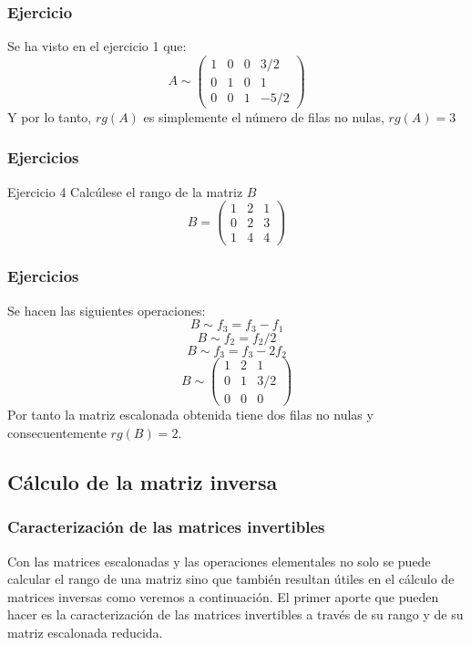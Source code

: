 \documentclass[12pt]{article}
\begin{document}
       \begin{frame}
  \frametitle{Ejercicio}
Se ha visto en el ejercicio 1 que:
  \[A\sim \left(\begin{array}{cccc}1 & 0 & 0 & 3/2 \\0 & 1 & 0 & 1 \\0 & 0 & 1 & -5/2\end{array}\right)\]
  Y por lo tanto, $rg(A)$ es simplemente el n\'umero de filas no nulas, $rg(A)=3$
  \end{frame} 
  
     \begin{frame}
  \frametitle{Ejercicios}
   \begin{block}{Ejercicio 4}
Calc\'ulese el rango de la matriz $B$
\[B= \left(\begin{array}{ccc}1 & 2 & 1 \\0 & 2 & 3 \\1 & 4 & 4\end{array}\right)\]
\end{block}
  \end{frame} 


     \begin{frame}
  \frametitle{Ejercicios}
Se hacen las siguientes operaciones:
\[B\sim f_3 = f_3-f_1\]
\[B\sim f_2 = f_2/2\]
\[B\sim f_3 = f_3-2f_2\]
\[B\sim \left(\begin{array}{ccc}1 & 2 & 1 \\0 & 1 & 3/2 \\0 & 0 & 0\end{array}\right)\]
Por tanto la matriz escalonada obtenida tiene dos filas no nulas y consecuentemente $rg(B)=2$.
  \end{frame} 
  
  
  
  \subsection{C\'alculo de la matriz inversa}
       \begin{frame}
  \frametitle{Caracterizaci\'on de las matrices invertibles}
Con las matrices escalonadas y las operaciones elementales no solo se puede calcular el rango de una matriz sino que tambi\'en resultan \'utiles en el c\'alculo de matrices inversas como veremos a continuaci\'on. El primer aporte que pueden hacer es la caracterizaci\'on de las matrices invertibles a trav\'es de su rango y de su matriz escalonada reducida.
  \end{frame} 
  
\end{document}
